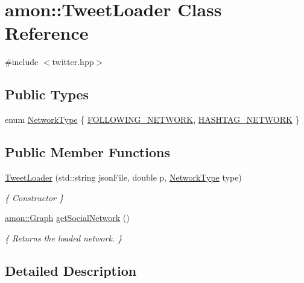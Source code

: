 \hypertarget{classamon_1_1_tweet_loader}{\section{amon\-:\-:Tweet\-Loader Class Reference}
\label{classamon_1_1_tweet_loader}
}


{\ttfamily \#include $<$twitter.\-hpp$>$}

\subsection*{Public Types}
\begin{DoxyCompactItemize}
\item 
enum \hyperlink{classamon_1_1_tweet_loader_ad125f05eb6d11acbdc8adf728d98f085}{Network\-Type} \{ \hyperlink{classamon_1_1_tweet_loader_ad125f05eb6d11acbdc8adf728d98f085a7728c489e3955f983f00b01622b43fb7}{F\-O\-L\-L\-O\-W\-I\-N\-G\-\_\-\-N\-E\-T\-W\-O\-R\-K}, 
\hyperlink{classamon_1_1_tweet_loader_ad125f05eb6d11acbdc8adf728d98f085a81ee659193460eb810f82b0ebc062e1f}{H\-A\-S\-H\-T\-A\-G\-\_\-\-N\-E\-T\-W\-O\-R\-K}
 \}
\end{DoxyCompactItemize}
\subsection*{Public Member Functions}
\begin{DoxyCompactItemize}
\item 
\hyperlink{classamon_1_1_tweet_loader_a5448a36953241e1d2d9b0c5d8b2712ff}{Tweet\-Loader} (std\-::string json\-File, double p, \hyperlink{classamon_1_1_tweet_loader_ad125f05eb6d11acbdc8adf728d98f085}{Network\-Type} type)
\begin{DoxyCompactList}\small\item\em \{ Constructor \} \end{DoxyCompactList}\item 
\hyperlink{classamon_1_1_graph}{amon\-::\-Graph} \hyperlink{classamon_1_1_tweet_loader_a292bc02ccb78e803ef5b1f84d713ea57}{get\-Social\-Network} ()
\begin{DoxyCompactList}\small\item\em \{ Returns the loaded network. \} \end{DoxyCompactList}\end{DoxyCompactItemize}


\subsection{Detailed Description}


